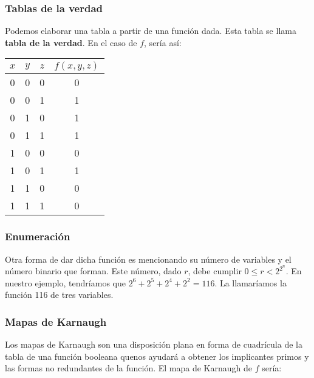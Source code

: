 \subsubsection{Tablas de la verdad}
Podemos elaborar una tabla a partir de una función dada. Esta tabla se llama \textbf{tabla de la verdad}. En el caso de $f$, sería así:
\begin{center}
    \begin{tabular}{ |c|c|c||c|  }
        \hline
        $x$ & $y$ & $z$ & $f(x,y,z)$ \\
        \hline
        0   & 0   & 0   & 0          \\
        0   & 0   & 1   & 1          \\
        0   & 1   & 0   & 1          \\
        0   & 1   & 1   & 1          \\
        1   & 0   & 0   & 0          \\
        1   & 0   & 1   & 1          \\
        1   & 1   & 0   & 0          \\
        1   & 1   & 1   & 0          \\
        \hline
    \end{tabular}
\end{center}

\subsubsection{Enumeración}
Otra forma de dar dicha función es mencionando su número de variables y el número binario que forman. Este número, dado $r$, debe cumplir $0 \leq r < 2^{2^n}$.
En nuestro ejemplo, tendríamos que $2^6+2^5+2^4+2^2 = 116$. La llamaríamos la función 116 de tres variables.

\subsubsection{Mapas de Karnaugh}
Los mapas de Karnaugh son una disposición plana en forma de cuadrícula de la tabla de una función booleana quenos ayudará a obtener los implicantes primos y las formas no redundantes de la función.
El mapa de Karnaugh de $f$ sería:
\begin{center}
    \begin{Karnaugh_2x4}
    \end{Karnaugh_2x4}
\end{center}

